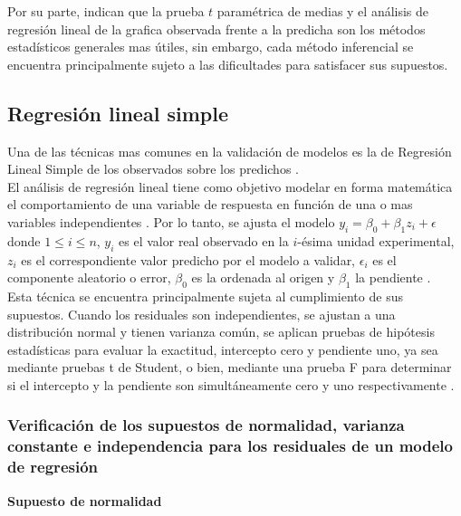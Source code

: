 Por su parte, \textcite{mayer-butler-1993} indican que la prueba $t$ paramétrica de medias y el análisis de regresión lineal de la grafica observada frente a la predicha son los métodos estadísticos generales mas útiles, sin embargo, cada método inferencial se encuentra principalmente sujeto a las dificultades para satisfacer sus supuestos.\\



\subsection{Regresión lineal simple}
Una de las técnicas mas comunes en la validación de modelos es la de Regresión Lineal Simple de los observados sobre los predichos \parencites{analla-1998, mayer-1994, tedeschi-2006}.\\

El análisis de regresión lineal tiene como objetivo modelar en forma matemática el comportamiento de una variable de respuesta en función de una o mas variables independientes \parencite{gutierrez-2012}. Por lo tanto, se ajusta el modelo  $ y_{i} = \beta_{0} + \beta_{1}z_{i} +\epsilon $ donde $ 1 \leq i \leq n$, $ y_{i}$ es el valor real observado en la $i$-ésima unidad experimental, $ z_{i}$ es el correspondiente valor predicho por el modelo a validar, $\epsilon_{i}$ es el componente aleatorio o error, $\beta_{0}$ es la ordenada al origen y $\beta_{1}$ la pendiente \parencite{zacarias-2023}.\\

Esta técnica se encuentra principalmente sujeta al cumplimiento de sus supuestos. Cuando los residuales son independientes, se ajustan a una distribución normal y tienen varianza común, se aplican pruebas de hipótesis estadísticas para evaluar la exactitud, intercepto cero y pendiente uno, ya sea mediante pruebas t de Student, o bien, mediante una prueba F para determinar si el intercepto y la pendiente son simultáneamente cero y uno respectivamente \parencite{balam-2012}.


\subsubsection{Verificación de los supuestos de normalidad, varianza constante e independencia para los residuales de un modelo de regresión}

\vspace{.8cm}

\textbf{Supuesto de normalidad}\\

